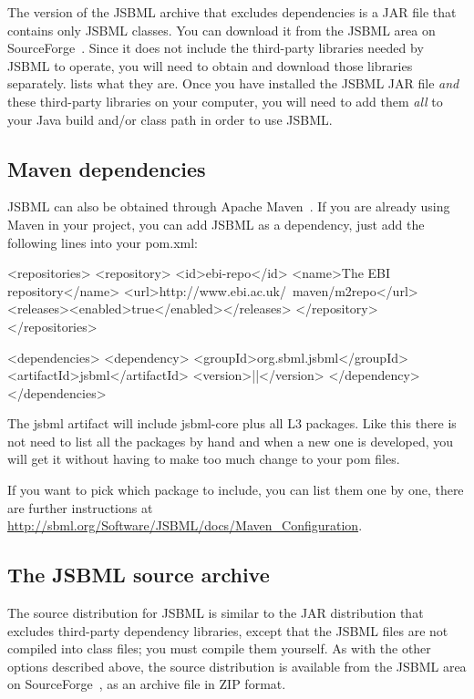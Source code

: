The version of the JSBML archive that excludes dependencies is a JAR file
that contains only JSBML classes. You can download it from the JSBML area
on SourceForge~\cite{JSBMLdownload}. Since it does not include the
third-party libraries needed by JSBML to operate, you will need to obtain
and download those libraries separately.  lists
what they are. Once you have installed the JSBML JAR file \emph{and} these
third-party libraries on your computer, you will need to add them
\emph{all} to your Java build and/or class path in order to use JSBML.


\subsection{Maven dependencies}

JSBML can also be obtained through Apache Maven~\citep{ApacheMaven}.
If you are already using Maven in your project, you can add JSBML
as a dependency, just add the following lines into your pom.xml:

\begin{example}[language=XML, title={Maven instructions to add to your pom.xml.}]
  <repositories>
    <repository>
      <id>ebi-repo</id>
      <name>The EBI repository</name>
      <url>http://www.ebi.ac.uk/~maven/m2repo</url>
      <releases><enabled>true</enabled></releases>
    </repository>
  </repositories>

  <dependencies>
    <dependency>
      <groupId>org.sbml.jsbml</groupId>
      <artifactId>jsbml</artifactId>
      <version>|\jsbmlversion|</version>
    </dependency>
  </dependencies> 
\end{example}

The jsbml artifact will include jsbml-core plus all L3 packages. Like this
there is not need to list all the packages by hand and when
a new one is developed, you will get it without having to make too much change to your
pom files. 

If you want to pick which package to include, you can list them one by one, there are
further instructions at \url{http://sbml.org/Software/JSBML/docs/Maven_Configuration}.


\subsection{The JSBML source archive}
\label{sec:jsbml-source-archive}

The source distribution for JSBML is similar to the JAR distribution that
excludes third-party dependency libraries, except that the JSBML files are
not compiled into class files; you must compile them yourself. As with the
other options described above, the source distribution is available from
the JSBML area on SourceForge~\cite{JSBMLdownload}, as an archive file in
ZIP format.

